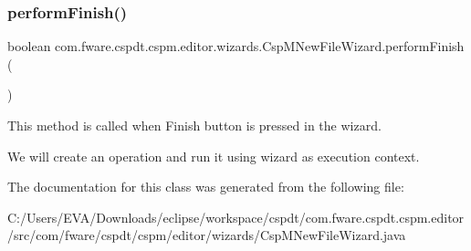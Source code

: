 \subsubsection{\texorpdfstring{perform\+Finish()}{performFinish()}}
{\footnotesize\ttfamily boolean com.\+fware.\+cspdt.\+cspm.\+editor.\+wizards.\+Csp\+M\+New\+File\+Wizard.\+perform\+Finish (\begin{DoxyParamCaption}{ }\end{DoxyParamCaption})\hspace{0.3cm}{\ttfamily [inline]}}



This method is called when \textquotesingle{}Finish\textquotesingle{} button is pressed in the wizard. 

We will create an operation and run it using wizard as execution context. 

The documentation for this class was generated from the following file\+:\begin{DoxyCompactItemize}
\item 
C\+:/\+Users/\+E\+V\+A/\+Downloads/eclipse/workspace/cspdt/com.\+fware.\+cspdt.\+cspm.\+editor/src/com/fware/cspdt/cspm/editor/wizards/Csp\+M\+New\+File\+Wizard.\+java\end{DoxyCompactItemize}
